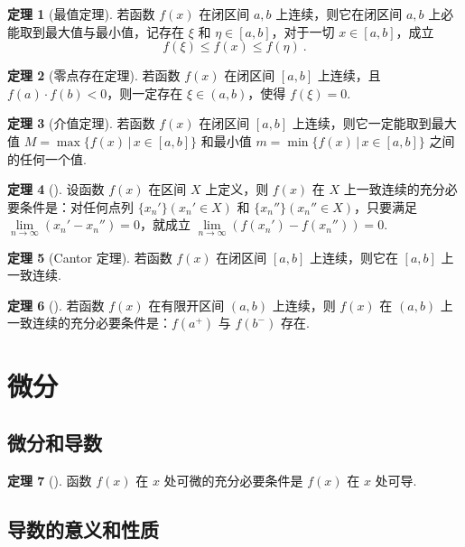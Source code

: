 \documentclass[zihao=-4,linespread=1.8,UTF8,nothm]{aytony_base}
\theoremstyle{definition}
\newtheorem{theorem}{\indent\heiti\textbf{定理}}[subsection]
\begin{document}
\begin{theorem}[最值定理]
    若函数 $f(x)$ 在闭区间 $a, b$ 上连续，则它在闭区间 $a, b$ 上必能取到最大值与最小值，记存在 $\xi$ 和 $\eta\in [a, b]$，对于一切 $x \in [a, b]$，成立 $$
        f(\xi) \leqslant f(x) \leqslant f(\eta)\ .
    $$
\end{theorem}

\begin{theorem}[零点存在定理]
    若函数 $f(x)$ 在闭区间 $[a, b]$ 上连续，且 $f(a) \cdot f(b) < 0$，则一定存在 $\xi \in (a, b)$，使得 $f(\xi) = 0$.
\end{theorem}

\begin{theorem}[介值定理]
    若函数 $f(x)$ 在闭区间 $[a, b]$ 上连续，则它一定能取到最大值 $M = \max\{f(x)\,|\,x \in [a, b]\}$ 和最小值 $m = \min\{f(x)\,|\,x \in [a, b]\}$ 之间的任何一个值.
\end{theorem}

\begin{theorem}[]
    设函数 $f(x)$ 在区间 $X$ 上定义，则 $f(x)$ 在 $X$ 上一致连续的充分必要条件是：对任何点列 $\{x_n'\}(x_n' \in X)$ 和 $\{x_n''\}(x_n'' \in X)$，只要满足 $\lim\limits_{n \to \infty} (x_n' - x_n'') = 0$，就成立 $\lim\limits_{n \to \infty} (f(x_n') - f(x_n'')) = 0$.
\end{theorem}

\begin{theorem}[Cantor 定理]
    若函数 $f(x)$ 在闭区间 $[a, b]$ 上连续，则它在 $[a, b]$ 上一致连续.
\end{theorem}

\begin{theorem}[]
    若函数 $f(x)$ 在有限开区间 $(a, b)$ 上连续，则 $f(x)$ 在 $(a, b)$ 上一致连续的充分必要条件是：$f(a^+)$ 与 $f(b^-)$ 存在.
\end{theorem}

\section{微分}

\subsection{微分和导数}

\begin{theorem}[]
    函数 $f(x)$ 在 $x$ 处可微的充分必要条件是 $f(x)$ 在 $x$ 处可导.
\end{theorem}

\subsection{导数的意义和性质}
\end{document}
